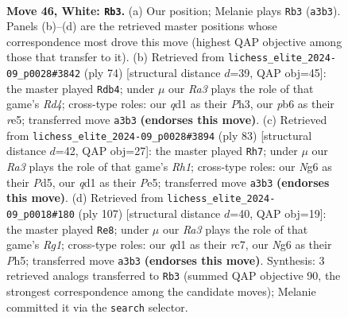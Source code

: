 \documentclass[11pt]{article}
\begin{document}
\clearpage

\begin{figure}[p]\centering
\begin{subfigure}{0.46\textwidth}\centering
\resizebox{\linewidth}{!}{%
\newchessgame
\chessboard[
  setfen={6k1/6p1/1p4N1/r2p4/P3p3/R7/2r2PK1/3q4 w - - 0 46},
  showmover=false,
  pgfstyle=straightmove, color=movearrow, markmove={a3-b3}
]}
\caption{}
\end{subfigure}\hfill
\begin{subfigure}{0.46\textwidth}\centering
\resizebox{\linewidth}{!}{%
\newchessgame
\chessboard[
  setfen={3r4/3Pkp1p/6p1/1p2r3/3R4/7P/8/1R5K w - - 0 38},
  showmover=false,
  pgfstyle=straightmove, color=movearrow, markmove={d4-b4}
]}
\caption{}
\end{subfigure}
\\[4pt]
\begin{subfigure}{0.46\textwidth}\centering
\resizebox{\linewidth}{!}{%
\newchessgame
\chessboard[
  setfen={7r/2p5/5k2/3pp3/7p/2R2P2/1P5R/1K6 b - - 2 42},
  showmover=false,
  pgfstyle=straightmove, color=movearrow, markmove={h8-h7}
]}
\caption{}
\end{subfigure}\hfill
\begin{subfigure}{0.46\textwidth}\centering
\resizebox{\linewidth}{!}{%
\newchessgame
\chessboard[
  setfen={6r1/2R5/1P1R2pk/2P4p/8/6PK/8/1r6 b - - 7 54},
  showmover=false,
  pgfstyle=straightmove, color=movearrow, markmove={g8-e8}
]}
\caption{}
\end{subfigure}
\caption{\textbf{Move 46, White: \texttt{Rb3}.} (a) Our position; Melanie plays \texttt{Rb3} (\texttt{a3b3}). Panels (b)--(d) are the retrieved master positions whose correspondence most drove this move (highest QAP objective among those that transfer to it). (b) Retrieved from \texttt{lichess\_elite\_2024-09\_p0028\#3842} (ply 74) [structural distance $d$=39, QAP obj=45]: the master played \texttt{Rdb4}; under $\mu$ our \emph{Ra3} plays the role of that game's \emph{Rd4}; cross-type roles: our \emph{q}d1 as their \emph{P}h3, our \emph{p}b6 as their \emph{r}e5; transferred move \texttt{a3b3} \textbf{(endorses this move)}. (c) Retrieved from \texttt{lichess\_elite\_2024-09\_p0028\#3894} (ply 83) [structural distance $d$=42, QAP obj=27]: the master played \texttt{Rh7}; under $\mu$ our \emph{Ra3} plays the role of that game's \emph{Rh1}; cross-type roles: our \emph{N}g6 as their \emph{P}d5, our \emph{q}d1 as their \emph{P}e5; transferred move \texttt{a3b3} \textbf{(endorses this move)}. (d) Retrieved from \texttt{lichess\_elite\_2024-09\_p0018\#180} (ply 107) [structural distance $d$=40, QAP obj=19]: the master played \texttt{Re8}; under $\mu$ our \emph{Ra3} plays the role of that game's \emph{Rg1}; cross-type roles: our \emph{q}d1 as their \emph{r}c7, our \emph{N}g6 as their \emph{P}h5; transferred move \texttt{a3b3} \textbf{(endorses this move)}. Synthesis: 3 retrieved analogs transferred to \texttt{Rb3} (summed QAP objective 90, the strongest correspondence among the candidate moves); Melanie committed it via the \texttt{search} selector.}
\label{fig:thought-m90}
\end{figure}
\end{document}
